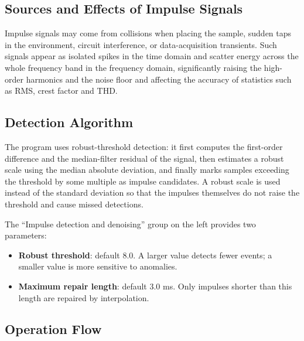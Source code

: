 \documentclass[UTF8,a4paper,12pt]{ctexart}
\begin{document}
\subsection{Sources and Effects of Impulse Signals}

Impulse signals may come from collisions when placing the sample, sudden taps in the environment, circuit interference, or data-acquisition transients. Such signals appear as isolated spikes in the time domain and scatter energy across the whole frequency band in the frequency domain, significantly raising the high-order harmonics and the noise floor and affecting the accuracy of statistics such as RMS, crest factor and THD.

\subsection{Detection Algorithm}

The program uses robust-threshold detection: it first computes the first-order difference and the median-filter residual of the signal, then estimates a robust scale using the median absolute deviation, and finally marks samples exceeding the threshold by some multiple as impulse candidates. A robust scale is used instead of the standard deviation so that the impulses themselves do not raise the threshold and cause missed detections.

The ``Impulse detection and denoising'' group on the left provides two parameters:

\begin{itemize}
  \item \textbf{Robust threshold}: default 8.0. A larger value detects fewer events; a smaller value is more sensitive to anomalies.
  \item \textbf{Maximum repair length}: default 3.0 ms. Only impulses shorter than this length are repaired by interpolation.
\end{itemize}

\subsection{Operation Flow}
\end{document}
